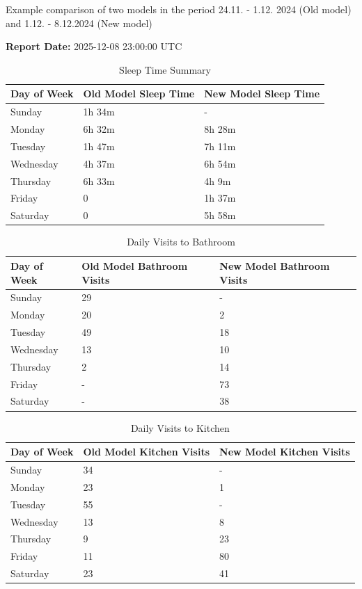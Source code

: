 \documentclass[A4,10pt]{article}
\begin{document}
Example comparison of two models in the period 24.11. - 1.12. 2024 (Old model) and 1.12. - 8.12.2024 (New model)

\textbf{Report Date:} 2025-12-08 23:00:00 UTC

\begin{table}[H]
\centering
\begin{tabular}{|l|l|l|}
\hline
\textbf{Day of Week} & \textbf{Old Model Sleep Time} & \textbf{New Model Sleep Time} \\ \hline
Sunday    & 1h 34m & -     \\ \hline
Monday    & 6h 32m & 8h 28m \\ \hline
Tuesday   & 1h 47m & 7h 11m \\ \hline
Wednesday & 4h 37m & 6h 54m \\ \hline
Thursday  & 6h 33m & 4h 9m  \\ \hline
Friday    & 0      & 1h 37m \\ \hline
Saturday  & 0      & 5h 58m \\ \hline
\end{tabular}
\caption{Sleep Time Summary}
\end{table}

\begin{table}[H]
\centering
\begin{tabular}{|l|l|l|}
\hline
\textbf{Day of Week} & \textbf{Old Model Bathroom Visits} & \textbf{New Model Bathroom Visits} \\ \hline
Sunday    & 29 & - \\ \hline
Monday    & 20 & 2 \\ \hline
Tuesday   & 49 & 18 \\ \hline
Wednesday & 13 & 10 \\ \hline
Thursday  & 2  & 14 \\ \hline
Friday    & -  & 73 \\ \hline
Saturday  & -  & 38 \\ \hline
\end{tabular}
\caption{Daily Visits to Bathroom}
\end{table}


\begin{table}[H]
\centering
\begin{tabular}{|l|l|l|}
\hline
\textbf{Day of Week} & \textbf{Old Model Kitchen Visits} & \textbf{New Model Kitchen Visits} \\ \hline
Sunday    & 34 & - \\ \hline
Monday    & 23 & 1 \\ \hline
Tuesday   & 55 & - \\ \hline
Wednesday & 13 & 8 \\ \hline
Thursday  & 9  & 23 \\ \hline
Friday    & 11 & 80 \\ \hline
Saturday  & 23 & 41 \\ \hline
\end{tabular}
\caption{Daily Visits to Kitchen}
\end{table}
\end{document}
